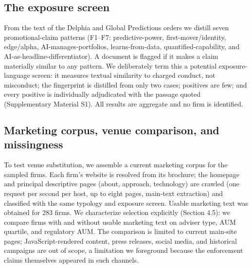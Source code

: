 \documentclass[utf8]{FrontiersinHarvard} %
\begin{document}
\subsection{The exposure screen}
From the text of the Delphia and Global Predictions orders we distill seven promotional-claim patterns (F1--F7: predictive-power, first-mover/identity, edge/alpha, AI-manages-portfolios, learns-from-data, quantified-capability, and AI-as-headline-differentiator). A document is flagged if it makes a claim materially similar to any pattern. We deliberately term this a potential exposure-language screen: it measures textual similarity to charged conduct, not misconduct; the fingerprint is distilled from only two cases; positives are few; and every positive is individually adjudicated with the passage quoted (Supplementary Material S1). All results are aggregate and no firm is identified.

\subsection{Marketing corpus, venue comparison, and missingness}
To test venue substitution, we assemble a current marketing corpus for the sampled firms. Each firm's website is resolved from its brochure; the homepage and principal descriptive pages (about, approach, technology) are crawled (one request per second per host, up to eight pages, main-text extraction) and classified with the same typology and exposure screen. Usable marketing text was obtained for 283 firms. We characterize selection explicitly (Section 4.5): we compare firms with and without usable marketing text on adviser type, AUM quartile, and regulatory AUM. The comparison is limited to current main-site pages; JavaScript-rendered content, press releases, social media, and historical campaigns are out of scope, a limitation we foreground because the enforcement claims themselves appeared in such channels.
\end{document}
